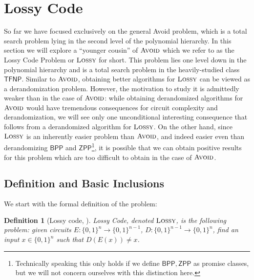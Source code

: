 \documentclass[11pt]{article}
\newtheorem{definition}{Definition}
\newcommand{\B}{\{0,1\}}
\newcommand{\avoid}{\textsc{Avoid}}
\newcommand{\lossy}{\textsc{Lossy}}
\begin{document}
\section{Lossy Code}\label{sec:lossy}


So far we have focused exclusively on the general Avoid problem, which is a total search problem lying in the second level of the polynomial hierarchy. In this section we will explore a ``younger cousin'' of $\avoid$ which we refer to as the Lossy Code Problem or $\lossy$ for short. This problem lies one level down in the polynomial hierarchy and is a total search problem in the heavily-studied class $\mathsf{TFNP}$. Similar to $\avoid$, obtaining better algorithms for $\lossy$ can be viewed as a derandomization problem. However, the motivation to study it is admittedly weaker than in the case of $\avoid$: while obtaining derandomized algorithms for $\avoid$ would have tremendous consequences for circuit complexity and derandomization, we will see only one unconditional interesting consequence that follows from a derandomized algorithm for $\lossy$. On the other hand, since $\lossy$ is an inherently easier problem than $\avoid$, and indeed easier even than derandomizing $\mathsf{BPP}$ and $\mathsf{ZPP}$\footnote{Technically speaking this only holds if we define $\mathsf{BPP}, \mathsf{ZPP}$ as promise classes, but we will not concern ourselves with this distinction here.}, it is possible that we can obtain positive results for this problem which are too difficult to obtain in the case of $\avoid$. 
\subsection{Definition and Basic Inclusions}
We start with the formal definition of the problem:
\begin{definition}[Lossy code, \cite{Korten2}]
Lossy Code, denoted $\lossy$, is the following problem: given circuits $E: \B^n \to \B^{n-1}$, $D: \B^{n-1} \to \B^n$, find an input $x \in \B^n$ such that $D(E(x)) \neq x$.
\end{definition}
\end{document}
